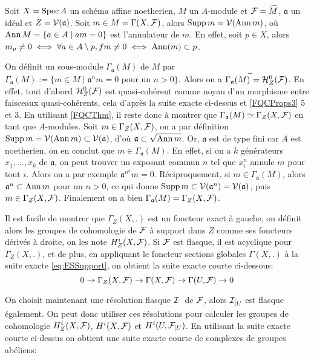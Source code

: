 \begin{ex}\label{cohomsupportaffineex}
Soit $X=\operatorname{Spec} A$ un schéma affine noetherien, $M$ un $A$-module et $\mathcal{F}=\widetilde{M}$, $\mathfrak{a}$ un idéal et $Z=\mathcal{V}(\mathfrak{a})$. Soit $m\in M=\Gamma(X,\mathcal{F})$, alors $\operatorname{Supp} m=\mathcal{V}(\operatorname{Ann} m)$, où $\operatorname{Ann} M=\lbrace a\in A\mid am=0\rbrace$ est l'annulateur de $m$. En effet, soit $p\in X$, alors $m_p\neq 0\iff \forall a\in A\setminus p, fm\neq 0\iff \operatorname{Ann}(m)\subset p$.

On définit un sous-module $\Gamma_\mathfrak{a}(M)$ de $M$ par $\Gamma_\mathfrak{a}(M):=\lbrace m\in M\mid \mathfrak{a}^nm=0 \text{ pour un } n>0 \rbrace$. Alors on a $\Gamma_\mathfrak{a}(M)^{\widetilde{}} = \mathcal{H} ^0 _Z(\mathcal{F})$. En effet, tout d'abord $\mathcal{H}^0 _Z(\mathcal{F})$ est quasi-cohérent comme noyau d'un morphisme entre faisceaux quasi-cohérents, cela d'après la suite exacte ci-dessus et \ref{FQCProps3} $5$ et $3$. En utilisant \ref{FQCThm}, il reste donc à montrer que $\Gamma_\mathfrak{a}(M)\simeq\Gamma_Z(X,\mathcal{F})$ en tant que $A$-modules. Soit $m\in\Gamma_Z(X,\mathcal{F})$, on a par définition $\operatorname{Supp} m=\mathcal{V}(\operatorname{Ann} m)\subset \mathcal{V}(\mathfrak{a})$, d'où $\mathfrak{a}\subset \sqrt{\operatorname{Ann} m}$. Or, $\mathfrak{a}$ est de type fini car $A$ est noetherien, on en conclut que $m\in \Gamma_\mathfrak{a}(M)$. En effet, si on a $k$ générateurs $x_1,...,x_k$ de $\mathfrak{a}$, on peut trouver un exposant commun $n$ tel que $x^n_i$ annule $m$ pour tout $i$. Alors on a par exemple $\mathfrak{a}^{n^k}m=0$. Réciproquement, si $m\in \Gamma_\mathfrak{a}(M)$, alors $\mathfrak{a}^n\subset \operatorname{Ann} m$ pour un $n>0$, ce qui donne $\operatorname{Supp} m \subset\mathcal{V}(\mathfrak{a}^n)=\mathcal{V}(\mathfrak{a})$, puis $m\in \Gamma_Z(X,\mathcal{F})$. Finalement on a bien $\Gamma_\mathfrak{a}(M)=\Gamma_Z(X,\mathcal{F})$.
\end{ex}

Il est facile de montrer que $\Gamma_Z(X, .)$ est un foncteur exact à gauche, on définit alors les groupes de cohomologie de $\mathcal{F}$ à support dans $Z$ comme ses foncteurs dérivés à droite, on les note $H_Z^i(X,\mathcal{F})$. Si $\mathcal{F}$ est flasque, il est acyclique pour $\Gamma_Z(X, .)$, et de plus, en appliquant le foncteur sections globales $\Gamma(X,.)$ à la suite exacte \ref{eq:ESSupport}, on obtient la suite exacte courte ci-dessous:
$$0\rightarrow \Gamma_Z(X,\mathcal{F})\rightarrow \Gamma(X,\mathcal{F})\rightarrow \Gamma(U,\mathcal{F})\rightarrow 0$$

On choisit maintenant une résolution flasque $\mathcal{I}^.$ de $\mathcal{F}$, alors $\mathcal{I}^._{|U}$ est flasque également. On peut donc utiliser ces résolutions pour calculer les groupes de cohomologie $H_Z^i(X,\mathcal{F})$, $H^i(X,\mathcal{F})$ et $H^i(U,\mathcal{F}_{|U})$. En utilisant la suite exacte courte ci-dessus on obtient une suite exacte courte de complexes de groupes abéliens:

